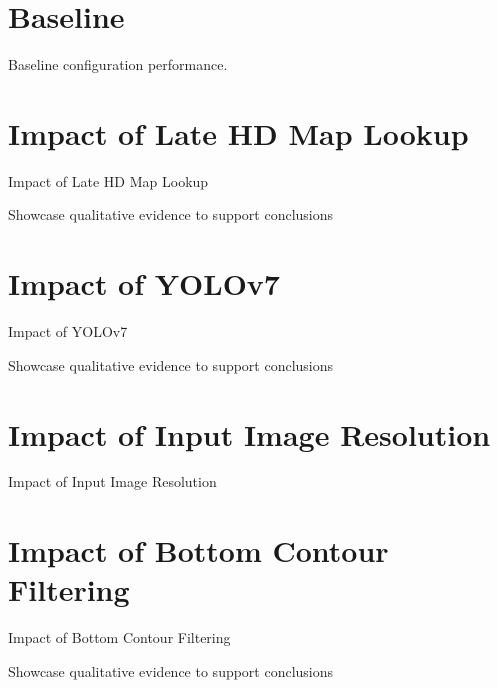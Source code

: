
\section{Baseline}
\label{sec:baseline}

Baseline configuration performance.


\section{Impact of Late HD Map Lookup}
\label{sec:impactlatemap}

Impact of Late HD Map Lookup

Showcase qualitative evidence to support conclusions

\newpage


\section{Impact of YOLOv7}
\label{sec:impactyolov7}

Impact of YOLOv7

Showcase qualitative evidence to support conclusions

\newpage


\section{Impact of Input Image Resolution}
\label{sec:impactresolution}

Impact of Input Image Resolution

\newpage


\section{Impact of Bottom Contour Filtering}
\label{sec:impactcontourfiltering}

Impact of Bottom Contour Filtering

Showcase qualitative evidence to support conclusions

\newpage

